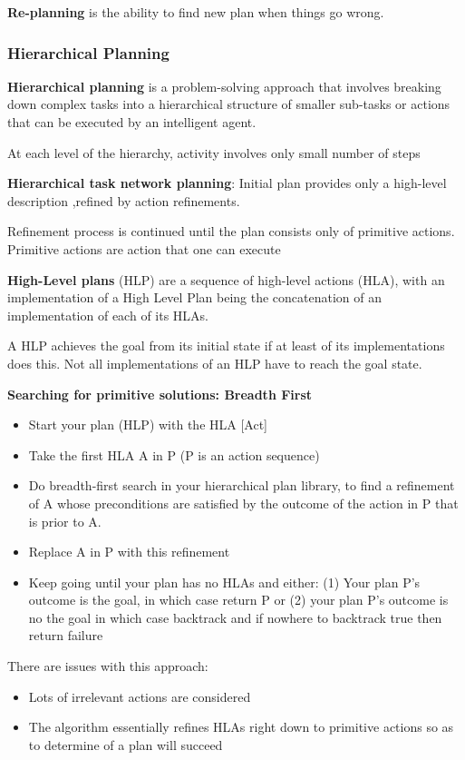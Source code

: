 \documentclass{article}
\begin{document}
 \textbf{Re-planning} is the ability to find new plan when things go wrong.

 \subsubsection{Hierarchical Planning}

 \textbf{Hierarchical planning} is a problem-solving approach that involves breaking down complex tasks into a hierarchical structure of smaller sub-tasks or actions that can be executed by an intelligent agent.

At each level of the hierarchy, activity involves only small number of steps

\textbf{Hierarchical task network planning}: Initial plan provides only a high-level description ,refined by action refinements. 

Refinement process is continued until the plan consists only of primitive actions. Primitive actions are action that one can execute

\textbf{High-Level plans} (HLP) are a sequence of high-level actions (HLA), with an implementation of a High Level Plan being the concatenation of an implementation of each of its HLAs.

A HLP achieves the goal from its initial state if at least of its implementations does this. Not all implementations of an HLP have to reach the goal state. 

\textbf{Searching for primitive solutions: Breadth First} \newline

\begin{itemize}
    \item Start your plan (HLP) with the HLA [Act]
    \item Take the first HLA A in P (P is an action sequence)
    \item Do breadth-first search in your hierarchical plan library, to find a refinement of A whose preconditions are satisfied by the outcome of the action in P that is prior to A. 
    \item Replace A in P with this refinement
    \item Keep going until your plan has no HLAs and either: (1) Your plan P's outcome is the goal, in which case return P or (2) your plan P's outcome is no the goal in which case backtrack and if nowhere to backtrack true then return failure
\end{itemize}

There are issues with this approach:
\begin{itemize}
    \item Lots of irrelevant actions are considered
    \item The algorithm essentially refines HLAs right down to primitive actions so as to determine of a plan will succeed
\end{itemize}
\end{document}
